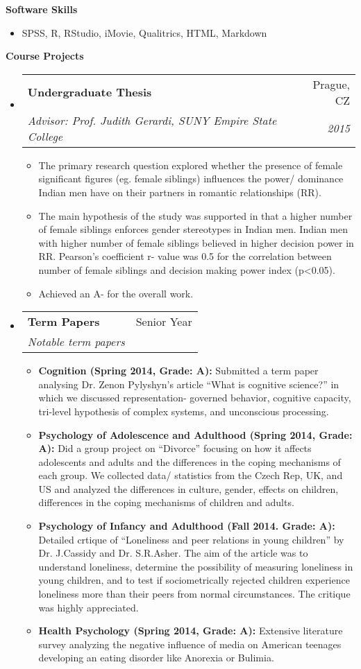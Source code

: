 \documentclass[letterpaper,11pt]{article}
\makeatletter
\newcommand{\resheading}[1]{{\large \colorbox{mygrey}{\begin{minipage}{\textwidth}{\textbf{#1 \vphantom{p\^{E}}}}\end{minipage}}}}
\newcommand{\ressubheading}[4]{
\begin{tabular*}{7.0in}{l@{\extracolsep{\fill}}r}
      \textbf{#1} & #2 \\
            \textit{#3} & \textit{#4} \\
\end{tabular*}\vspace{-6pt}}
\makeatother
\begin{document}
\resheading{Software Skills}
\begin{itemize}
\item{SPSS, R, RStudio, iMovie, Qualitrics, HTML, Markdown}
\end{itemize}


\resheading{Course Projects}
\begin{itemize}

\item
    \ressubheading{Undergraduate Thesis}{Prague, CZ}{Advisor: Prof. Judith Gerardi, SUNY Empire State College}{2015}
      \begin{itemize}
            \item{The primary research question explored whether the presence of female significant figures (eg.  female siblings) influences the power/ dominance Indian men have on their partners in romantic relationships (RR).}
            \item{The main hypothesis of the study was supported in that a higher number of female siblings enforces gender stereotypes in Indian men. Indian men with higher number of female siblings believed in higher decision power in RR. Pearson's coefficient r- value was 0.5 for the correlation between number of female siblings and decision making power index (p<0.05).}
              \item{Achieved an A- for the overall work.}
      \end{itemize}


\item
    \ressubheading{Term Papers}{Senior Year}{Notable term papers}{}
      \begin{itemize}
            \item{\textbf{Cognition (Spring 2014, Grade: A):} Submitted a term paper analysing Dr. Zenon Pylyshyn’s article ``What is cognitive science?'' in which we discussed representation- governed behavior, cognitive capacity, tri-level hypothesis of complex systems, and unconscious processing.}
            \item{\textbf{Psychology of Adolescence and Adulthood (Spring 2014, Grade: A):} Did a group project on ``Divorce'' focusing on how it affects adolescents and adults and the differences in the coping mechanisms of each group. We collected data/ statistics from the Czech Rep, UK, and US and analyzed the differences in culture, gender, effects on children, differences in the coping mechanisms of children and adults.}
            \item{\textbf{Psychology of Infancy and Adulthood (Fall 2014. Grade: A):} Detailed crtique of ``Loneliness and peer relations in young children'' by Dr. J.Cassidy and Dr. S.R.Asher. The aim of the article was to understand loneliness, determine the possibility of measuring loneliness in young children, and to test if sociometrically rejected children experience loneliness more than their peers from normal circumstances. The critique was highly appreciated.}
            \item{\textbf{Health Psychology (Spring 2014, Grade: A):} Extensive literature survey analyzing the negative influence of media on American teenages developing an eating disorder like Anorexia or Bulimia.} 
      \end{itemize}


\end{itemize}
\end{document}
